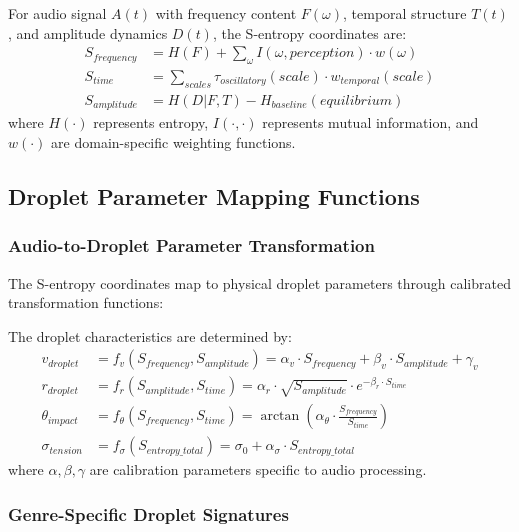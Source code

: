 \begin{definition}
For audio signal $A(t)$ with frequency content $F(\omega)$, temporal structure $T(t)$, and amplitude dynamics $D(t)$, the S-entropy coordinates are:
\begin{align}
S_{frequency} &= H(F) + \sum_{\omega} I(\omega, perception) \cdot w(\omega) \\
S_{time} &= \sum_{scales} \tau_{oscillatory}(scale) \cdot w_{temporal}(scale) \\  
S_{amplitude} &= H(D|F,T) - H_{baseline}(equilibrium)
\end{align}
where $H(\cdot)$ represents entropy, $I(\cdot,\cdot)$ represents mutual information, and $w(\cdot)$ are domain-specific weighting functions.
\end{definition}

\subsection{Droplet Parameter Mapping Functions}

\subsubsection{Audio-to-Droplet Parameter Transformation}

The S-entropy coordinates map to physical droplet parameters through calibrated transformation functions:

\begin{definition}
The droplet characteristics are determined by:
\begin{align}
v_{droplet} &= f_v(S_{frequency}, S_{amplitude}) = \alpha_v \cdot S_{frequency} + \beta_v \cdot S_{amplitude} + \gamma_v \\
r_{droplet} &= f_r(S_{amplitude}, S_{time}) = \alpha_r \cdot \sqrt{S_{amplitude}} \cdot e^{-\beta_r \cdot S_{time}} \\
\theta_{impact} &= f_\theta(S_{frequency}, S_{time}) = \arctan(\alpha_\theta \cdot \frac{S_{frequency}}{S_{time}}) \\
\sigma_{tension} &= f_\sigma(S_{entropy\_total}) = \sigma_0 + \alpha_\sigma \cdot S_{entropy\_total}
\end{align}
where $\alpha, \beta, \gamma$ are calibration parameters specific to audio processing.
\end{definition}

\subsubsection{Genre-Specific Droplet Signatures}

